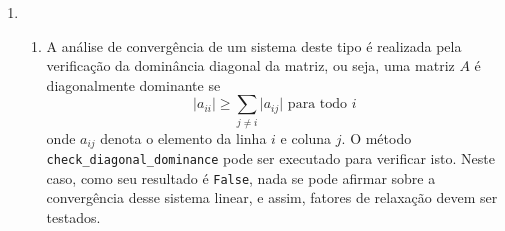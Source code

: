 \documentclass{article}
\newenvironment{arabenum}{
    \begin{enumerate}[label=\textbf{\arabic*})]
}{
    \end{enumerate}
}
\newenvironment{alphenum}{
    \begin{enumerate}[label=(\alph*)]
}{
    \end{enumerate}
}
\begin{document}
\begin{arabenum}
\begin{alphenum}
\item Considera-se $n$ o número de equações do sistema, e $c$ uma unidade de
computação.

\begin{itemize}

\item Para somas, tem-se
\begin{equation*}
\sum_{i=1}^n \sum_{j=i+1}^n c = c \cdot n \cdot \Big( \frac{1}{2}(n-1) \Big)
\end{equation*}

\item Para subtrações, tem-se
\begin{equation*}
c \cdot n + \sum_{i=1}^n \sum_{j=i+1}^n c
+ \sum_{i=1}^n \sum_{j=i+1}^n \sum_{k=i+1}^n c
= c \cdot n \cdot \Big( \frac{1}{6}(2n^2 - 3n + 1) + \frac{1}{2}(n-1) + 1 \Big)
\end{equation*}

\item Para multiplicações, tem-se
\begin{equation*}
2 \cdot \Big( \sum_{i=1}^n \sum_{j=i+1}^n c \Big)
+ \sum_{i=1}^n \sum_{j=i+1}^n \sum_{k=i+1}^n c
= c \cdot n \cdot \Big( (n-1) + \frac{1}{6}(2n^2 - 3n + 1) \Big)
\end{equation*}

\item Para divisões, tem-se
\begin{equation*}
c \cdot n + \sum_{i=1}^n \sum_{j=i+1}^n c
= c \cdot n \cdot \Big( \frac{1}{2}(n-1) + 1 \Big)
\end{equation*}

\end{itemize}

Então, o número final de operações é de
\begin{equation*}
c \cdot n \cdot \Big( \frac{5}{2}(n-1) + \frac{1}{3}(2n^2 - 3n + 1) + 2 \Big).
\end{equation*}

\end{alphenum}

\item \begin{alphenum}

\item A análise de convergência de um sistema deste tipo é realizada pela
verificação da dominância diagonal da matriz, ou seja, uma matriz $A$ é
diagonalmente dominante se
\begin{equation*}
\vert a_{ii} \vert \geq \sum_{j \neq i} \vert a_{ij} \vert \text{ para todo } i
\end{equation*}
onde $a_{ij}$ denota o elemento da linha $i$ e coluna $j$. O método
\texttt{check\_diagonal\_dominance} pode ser executado para verificar isto.
Neste caso, como seu resultado é \verb!False!, nada se pode afirmar sobre a
convergência desse sistema linear, e assim, fatores de relaxação devem ser
testados.


\end{alphenum}
\end{arabenum}
\end{document}
